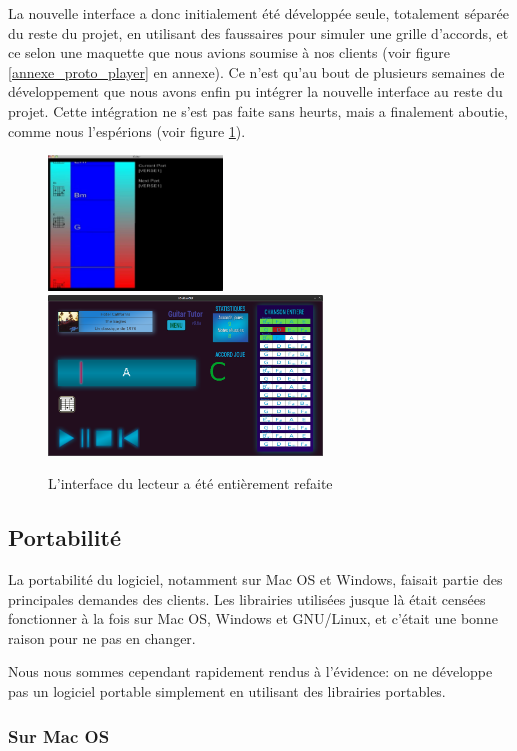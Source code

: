 La nouvelle interface a donc initialement été développée seule, totalement séparée du reste du projet, en utilisant des faussaires pour simuler une grille d'accords, et ce selon une maquette que nous avions soumise à nos clients (voir figure \ref{annexe_proto_player} en annexe). Ce n'est qu'au bout de plusieurs semaines de développement que nous avons enfin pu intégrer la nouvelle interface au reste du projet. Cette intégration ne s'est pas faite sans heurts, mais a finalement aboutie, comme nous l'espérions (voir figure \ref{interface_player}).

\begin{figure}[H]
\begin{center}
\includegraphics[width=175px]{ancien_player.png}
\includegraphics[width=275px]{interface_player.png}
\caption{L'interface du lecteur a été entièrement refaite}
\label{interface_player}
\end{center}
\end{figure}

\subsection{Portabilité}

La portabilité du logiciel, notamment sur Mac OS et Windows, faisait partie des principales demandes des clients. Les librairies utilisées jusque là était censées fonctionner à la fois sur Mac OS, Windows et GNU/Linux, et c'était une bonne raison pour ne pas en changer.

Nous nous sommes cependant rapidement rendus à l'évidence: on ne développe pas un logiciel portable simplement en utilisant des librairies portables.

\subsubsection*{Sur Mac OS}

